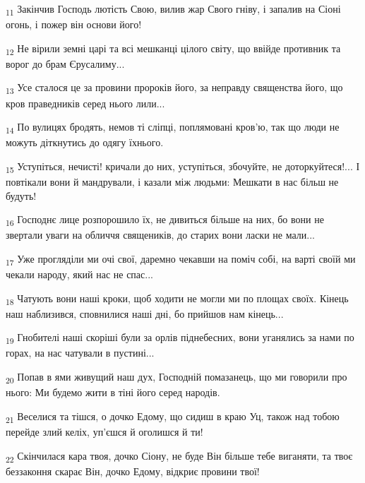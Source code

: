\begin{tcolorbox}
\textsubscript{11} Закінчив Господь лютість Свою, вилив жар Свого гніву, і запалив на Сіоні огонь, і пожер він основи його!
\end{tcolorbox}
\begin{tcolorbox}
\textsubscript{12} Не вірили земні царі та всі мешканці цілого світу, що ввійде противник та ворог до брам Єрусалиму...
\end{tcolorbox}
\begin{tcolorbox}
\textsubscript{13} Усе сталося це за провини пророків його, за неправду священства його, що кров праведників серед нього лили...
\end{tcolorbox}
\begin{tcolorbox}
\textsubscript{14} По вулицях бродять, немов ті сліпці, поплямовані кров'ю, так що люди не можуть діткнутись до одягу їхнього.
\end{tcolorbox}
\begin{tcolorbox}
\textsubscript{15} Уступіться, нечисті! кричали до них, уступіться, збочуйте, не доторкуйтеся!... І повтікали вони й мандрували, і казали між людьми: Мешкати в нас більш не будуть!
\end{tcolorbox}
\begin{tcolorbox}
\textsubscript{16} Господнє лице розпорошило їх, не дивиться більше на них, бо вони не звертали уваги на обличчя священиків, до старих вони ласки не мали...
\end{tcolorbox}
\begin{tcolorbox}
\textsubscript{17} Уже прогляділи ми очі свої, даремно чекавши на поміч собі, на варті своїй ми чекали народу, який нас не спас...
\end{tcolorbox}
\begin{tcolorbox}
\textsubscript{18} Чатують вони наші кроки, щоб ходити не могли ми по площах своїх. Кінець наш наблизився, сповнилися наші дні, бо прийшов нам кінець...
\end{tcolorbox}
\begin{tcolorbox}
\textsubscript{19} Гнобителі наші скоріші були за орлів піднебесних, вони уганялись за нами по горах, на нас чатували в пустині...
\end{tcolorbox}
\begin{tcolorbox}
\textsubscript{20} Попав в ями живущий наш дух, Господній помазанець, що ми говорили про нього: Ми будемо жити в тіні його серед народів.
\end{tcolorbox}
\begin{tcolorbox}
\textsubscript{21} Веселися та тішся, о дочко Едому, що сидиш в краю Уц, також над тобою перейде злий келіх, уп'єшся й оголишся й ти!
\end{tcolorbox}
\begin{tcolorbox}
\textsubscript{22} Скінчилася кара твоя, дочко Сіону, не буде Він більше тебе виганяти, та твоє беззаконня скарає Він, дочко Едому, відкриє провини твої!
\end{tcolorbox}
